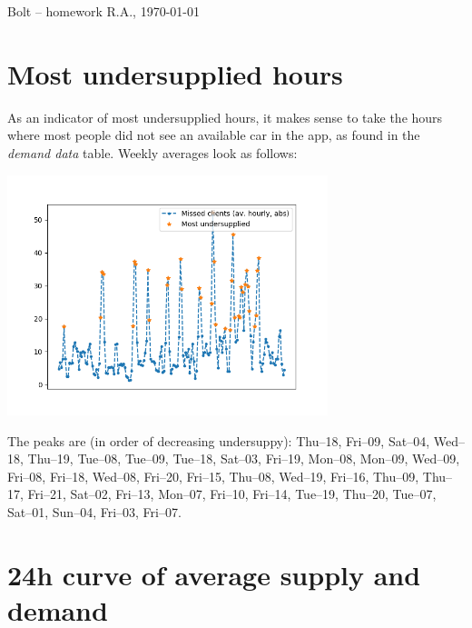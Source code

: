 \documentclass[12pt,a4paper]{article}
\begin{document}
    
    Bolt -- homework \hfill R.A., \today
    
    
    \section{Most undersupplied hours}
    
    As an indicator of most undersupplied hours,
    it makes sense to take
    the hours where
    most people did not see an available car
    in the app,
    as found in the \emph{demand data} table.
    Weekly averages look as follows:
    
    \begin{center}
        \includegraphics[width=0.7\textwidth]{task1/undersupp_abs}
    \end{center}
    
    The peaks are (in order of decreasing undersuppy):
    Thu--18,
    Fri--09,
    Sat--04,
    Wed--18,
    Thu--19,
    Tue--08,
    Tue--09,
    Tue--18,
    Sat--03,
    Fri--19,
    Mon--08,
    Mon--09,
    Wed--09,
    Fri--08,
    Fri--18,
    Wed--08,
    Fri--20,
    Fri--15,
    Thu--08,
    Wed--19,
    Fri--16,
    Thu--09,
    Thu--17,
    Fri--21,
    Sat--02,
    Fri--13,
    Mon--07,
    Fri--10,
    Fri--14,
    Tue--19,
    Thu--20,
    Tue--07,
    Sat--01,
    Sun--04,
    Fri--03,
    Fri--07.
    
    \newpage
    
    \section{24h curve of average supply and demand}
\end{document}
